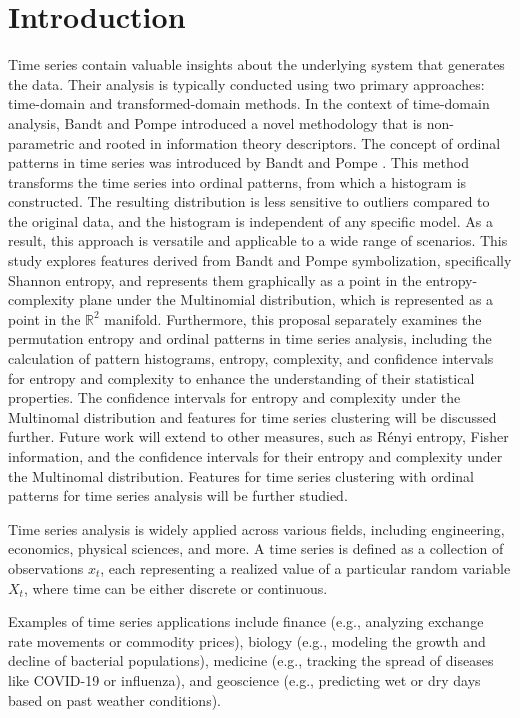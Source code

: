 \chapter{Introduction}\label{C:intro}

Time series contain valuable insights about the underlying system that generates the data. Their analysis is typically conducted using two primary approaches: time-domain and transformed-domain methods. In the context of time-domain analysis, Bandt and Pompe \cite{PhysRevLett.88.174102} introduced a novel methodology that is non-parametric and rooted in information theory descriptors. The concept of ordinal patterns in time series was introduced by Bandt and Pompe \cite{PhysRevLett.88.174102}. This method transforms the time series into ordinal patterns, from which a histogram is constructed. The resulting distribution is less sensitive to outliers compared to the original data, and the histogram is independent of any specific model. As a result, this approach is versatile and applicable to a wide range of scenarios.  This study explores features derived from Bandt and Pompe symbolization, specifically Shannon entropy, and represents them graphically as a point in the entropy-complexity plane under the Multinomial distribution, which is represented as a point in the $\mathbb{R}^2$ manifold. Furthermore, this proposal separately examines the permutation entropy and ordinal patterns in time series analysis, including the calculation of pattern histograms, entropy, complexity, and confidence intervals for entropy and complexity to enhance the understanding of their statistical properties. 
The confidence intervals for entropy and complexity under the Multinomal distribution and features for time series clustering will be discussed further. 
Future work will extend to other measures, such as Rényi entropy, Fisher information, and the confidence intervals for their entropy and complexity under the Multinomal distribution. Features for time series clustering with ordinal patterns for time series analysis will be further studied.

Time series analysis is widely applied across various fields, including engineering, economics, physical sciences, and more. A time series is defined as a collection of observations ${x_t}$, each representing a realized value of a particular random variable $X_t$, where time can be either discrete or continuous.

Examples of time series applications include finance (e.g., analyzing exchange rate movements or commodity prices), biology (e.g., modeling the growth and decline of bacterial populations), medicine (e.g., tracking the spread of diseases like COVID-19 or influenza), and geoscience (e.g., predicting wet or dry days based on past weather conditions).

